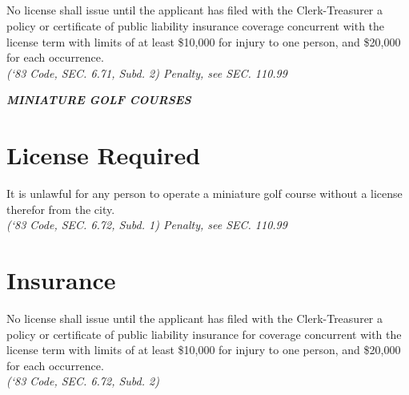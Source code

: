 \subsection{}
No license shall issue until the applicant has filed with the Clerk-Treasurer a policy or certificate of public liability insurance coverage concurrent with the license term with limits of at least \$10,000 for injury to one person, and \$20,000 for each occurrence.\\
\emph{(‘83 Code, SEC. 6.71, Subd. 2)  Penalty, see SEC. 110.99}

\begin{center}
    \emph{\textbf{\LARGE{MINIATURE GOLF COURSES}}}
\end{center}

\setcounter{section}{74}
\section{License Required}
It is unlawful for any person to operate a miniature golf course without a license therefor from the city.\\
\emph{(‘83 Code, SEC. 6.72, Subd. 1)  Penalty, see SEC. 110.99}
\section{Insurance}
No license shall issue until the applicant has filed with the Clerk-Treasurer a policy or certificate of public liability insurance for coverage concurrent with the license term with limits of at least \$10,000 for injury to one person, and \$20,000 for each occurrence.\\
\emph{(‘83 Code, SEC. 6.72, Subd. 2)}
